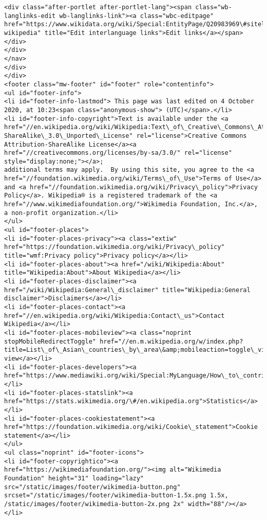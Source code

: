 \documentclass[11pt]{article}
\begin{document}
\begin{Verbatim}[commandchars=\\\{\}]
<div class="after-portlet after-portlet-lang"><span class="wb-langlinks-edit wb-langlinks-link"><a class="wbc-editpage" href="https://www.wikidata.org/wiki/Special:EntityPage/Q20983969\#sitelinks-wikipedia" title="Edit interlanguage links">Edit links</a></span></div>
</div>
</nav>
</div>
</div>
<footer class="mw-footer" id="footer" role="contentinfo">
<ul id="footer-info">
<li id="footer-info-lastmod"> This page was last edited on 4 October 2020, at 10:23<span class="anonymous-show"> (UTC)</span>.</li>
<li id="footer-info-copyright">Text is available under the <a href="//en.wikipedia.org/wiki/Wikipedia:Text\_of\_Creative\_Commons\_Attribution-ShareAlike\_3.0\_Unported\_License" rel="license">Creative Commons Attribution-ShareAlike License</a><a href="//creativecommons.org/licenses/by-sa/3.0/" rel="license" style="display:none;"></a>;
additional terms may apply.  By using this site, you agree to the <a href="//foundation.wikimedia.org/wiki/Terms\_of\_Use">Terms of Use</a> and <a href="//foundation.wikimedia.org/wiki/Privacy\_policy">Privacy Policy</a>. Wikipedia® is a registered trademark of the <a href="//www.wikimediafoundation.org/">Wikimedia Foundation, Inc.</a>, a non-profit organization.</li>
</ul>
<ul id="footer-places">
<li id="footer-places-privacy"><a class="extiw" href="https://foundation.wikimedia.org/wiki/Privacy\_policy" title="wmf:Privacy policy">Privacy policy</a></li>
<li id="footer-places-about"><a href="/wiki/Wikipedia:About" title="Wikipedia:About">About Wikipedia</a></li>
<li id="footer-places-disclaimer"><a href="/wiki/Wikipedia:General\_disclaimer" title="Wikipedia:General disclaimer">Disclaimers</a></li>
<li id="footer-places-contact"><a href="//en.wikipedia.org/wiki/Wikipedia:Contact\_us">Contact Wikipedia</a></li>
<li id="footer-places-mobileview"><a class="noprint stopMobileRedirectToggle" href="//en.m.wikipedia.org/w/index.php?title=List\_of\_Asian\_countries\_by\_area\&amp;mobileaction=toggle\_view\_mobile">Mobile view</a></li>
<li id="footer-places-developers"><a href="https://www.mediawiki.org/wiki/Special:MyLanguage/How\_to\_contribute">Developers</a></li>
<li id="footer-places-statslink"><a href="https://stats.wikimedia.org/\#/en.wikipedia.org">Statistics</a></li>
<li id="footer-places-cookiestatement"><a href="https://foundation.wikimedia.org/wiki/Cookie\_statement">Cookie statement</a></li>
</ul>
<ul class="noprint" id="footer-icons">
<li id="footer-copyrightico"><a href="https://wikimediafoundation.org/"><img alt="Wikimedia Foundation" height="31" loading="lazy" src="/static/images/footer/wikimedia-button.png" srcset="/static/images/footer/wikimedia-button-1.5x.png 1.5x, /static/images/footer/wikimedia-button-2x.png 2x" width="88"/></a></li>

\end{Verbatim}
\end{document}
